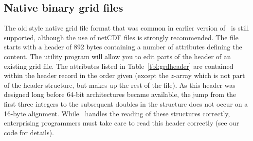 \subsection{Native binary grid files}

The old style native grid file format that was common in earlier version of \GMT\ is still
supported, although the use of netCDF files is strongly recommended.
The file starts with a header of 892 bytes containing a number of attributes defining the content.
The  utility program will allow you to edit parts of
the header of an existing grid file.  The attributes listed in Table~\ref{tbl:grdheader}
are contained within the header record in the order given (except the $z$-array which
is not part of the header structure, but makes up the rest of the file). As this header
was designed long before 64-bit architectures became available, the jump from
the first three integers to the subsequent doubles in the structure does not occur on a
16-byte alignment.  While \GMT\ handles the reading of these structures correctly, enterprising
programmers must take care to read this header correctly (see our code for details).

